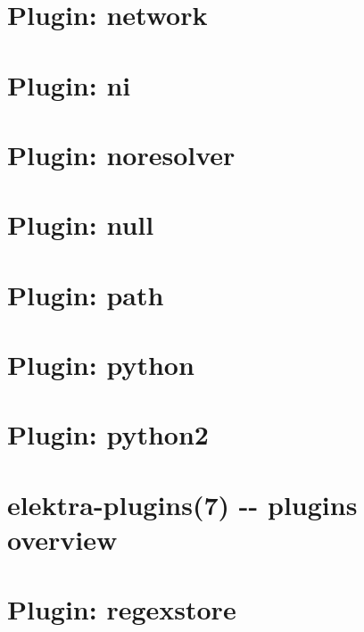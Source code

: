 \documentclass[twoside]{book}
\newcommand{\+}{\discretionary{\mbox{\scriptsize$\hookleftarrow$}}{}{}}
\begin{document}
\chapter{Plugin\+: network}
\label{md_src_plugins_network_README}
\hypertarget{md_src_plugins_network_README}{}

\chapter{Plugin\+: ni}
\label{md_src_plugins_ni_README}
\hypertarget{md_src_plugins_ni_README}{}

\chapter{Plugin\+: noresolver}
\label{md_src_plugins_noresolver_README}
\hypertarget{md_src_plugins_noresolver_README}{}

\chapter{Plugin\+: null}
\label{md_src_plugins_null_README}
\hypertarget{md_src_plugins_null_README}{}

\chapter{Plugin\+: path}
\label{md_src_plugins_path_README}
\hypertarget{md_src_plugins_path_README}{}

\chapter{Plugin\+: python}
\label{md_src_plugins_python_README}
\hypertarget{md_src_plugins_python_README}{}

\chapter{Plugin\+: python2}
\label{md_src_plugins_python2_README}
\hypertarget{md_src_plugins_python2_README}{}

\chapter{elektra-\/plugins(7) -\/-\/ plugins overview}
\label{md_src_plugins_README}
\hypertarget{md_src_plugins_README}{}

\chapter{Plugin\+: regexstore}
\label{md_src_plugins_regexstore_README}
\hypertarget{md_src_plugins_regexstore_README}{}

\end{document}
